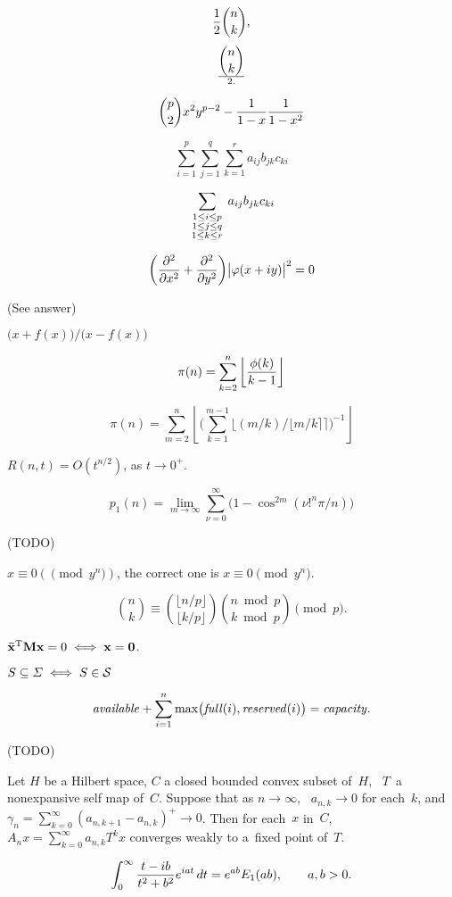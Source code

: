  $${1\over2}{n\choose k},$$ $$\displaystyle{n\choose k}\over2.$$

 $${p\choose 2}x^2y^{p-2}-{1\over1-x}{1\over1-x^2}$$

 $$\sum_{i=1}^p\sum_{j=1}^q\sum_{k=1}^ra_{ij}b_{jk}c_{ki}$$

 $$\sum_{\scriptstyle1\le i\le p\atop{\scriptstyle1\le j\le q\atop\scriptstyle1\le k\le r}}a_{ij}b_{jk}c_{ki}$$

$$
\biggl({\partial^2\over\partial x^2}+{\partial^2\over\partial y^2}\biggr)
{\bigl|\varphi(x+iy)\bigr|}^2
= 0
$$

 (See answer)

 $\bigl(x+f(x)\bigr)\big/\bigl(x-f(x)\bigr)$

 $$\pi(n) = \sum_{k=2}^n\left\lfloor{\phi(k)\over k-1}\right\rfloor$$

$$
\pi(n)=
\sum_{m=2}^n\left\lfloor\biggl(\sum_{k=1}^{m-1}\bigl\lfloor(m/k)\big/\lfloor m/k\rceil\bigr\rceil\biggr)^{-1}\right\rfloor
$$

 $R(n, t) = O(t^{n/2})$, as $t \to 0^+$.

 $$
p_1(n) = \lim_{m\to\infty}\sum_{\nu=0}^\infty\bigl(1-\cos^{2m}(\nu!^n\pi/n)\bigr)
$$

 (TODO)

 $x\equiv0 (\pmod y^n)$, the correct one is $x\equiv0\pmod{y^n}$.

 $$
{n\choose k}\equiv
{\lfloor n/p\rfloor\choose\lfloor k/p\rfloor}
{n \bmod p\choose k\bmod p}
\pmod p.
$$

 $\bf\bar x^{\rm T}Mx = {\rm 0} \iff x = 0$.

 $S \subseteq {\mit\Sigma} \iff S \in {\cal S}$

 $$
{\it available} + \sum_{i=1}^n\max\bigl({\it full}(i), {\it reserved}(i)\bigr)={\it capacity}.
$$

 (TODO)

 Let $H$ be a Hilbert space, $C$ a closed bounded convex subset of~$H$, \ $T$~a
nonexpansive self map of~$C$. Suppose that as $n\to\infty$, \ $a_{n,k}\to0$ for each~$k$,
and $\gamma_n = \sum_{k=0}^\infty(a_{n,k+1}-a_{n,k})^+\to 0$. Then for each~$x$ in~$C$, \ 
$A_nx = \sum_{k=0}^\infty a_{n,k}T^k x$ converges weakly to a~fixed point of~$T$.

 $$
\int_0^\infty{t-ib\over t^2 + b^2}e^{iat}\,dt
= e^{ab}E_1(ab), \qquad a,b > 0.
$$


